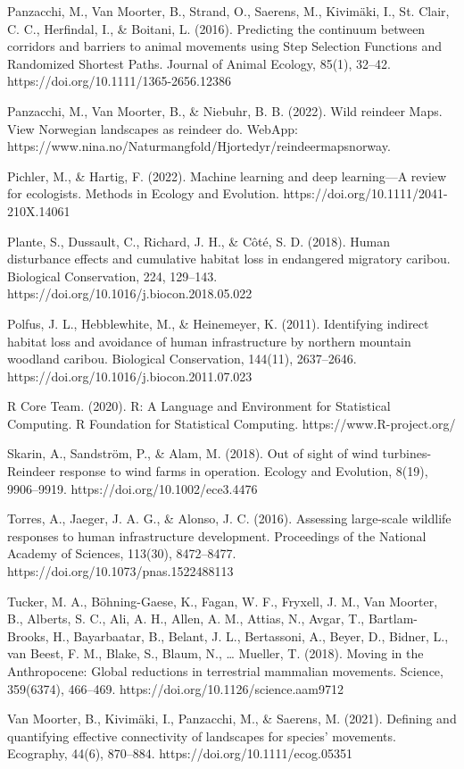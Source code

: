 \documentclass[titlepage]{article}
\begin{document}
Panzacchi, M., Van Moorter, B., Strand, O., Saerens, M., Kivimäki, I., St. Clair, C. C., Herfindal, I., & Boitani, L. (2016). Predicting the continuum between corridors and barriers to animal movements using Step Selection Functions and Randomized Shortest Paths. Journal of Animal Ecology, 85(1), 32–42. https://doi.org/10.1111/1365-2656.12386

Panzacchi, M., Van Moorter, B., & Niebuhr, B. B. (2022). Wild reindeer Maps. View Norwegian landscapes as reindeer do. WebApp: https://www.nina.no/Naturmangfold/Hjortedyr/reindeermapsnorway.

Pichler, M., & Hartig, F. (2022). Machine learning and deep learning—A review for ecologists. Methods in Ecology and Evolution. https://doi.org/10.1111/2041-210X.14061

Plante, S., Dussault, C., Richard, J. H., & Côté, S. D. (2018). Human disturbance effects and cumulative habitat loss in endangered migratory caribou. Biological Conservation, 224, 129–143. https://doi.org/10.1016/j.biocon.2018.05.022

Polfus, J. L., Hebblewhite, M., & Heinemeyer, K. (2011). Identifying indirect habitat loss and avoidance of human infrastructure by northern mountain woodland caribou. Biological Conservation, 144(11), 2637–2646. https://doi.org/10.1016/j.biocon.2011.07.023

R Core Team. (2020). R: A Language and Environment for Statistical Computing. R Foundation for Statistical Computing. https://www.R-project.org/

Skarin, A., Sandström, P., & Alam, M. (2018). Out of sight of wind turbines-Reindeer response to wind farms in operation. Ecology and Evolution, 8(19), 9906–9919. https://doi.org/10.1002/ece3.4476

Torres, A., Jaeger, J. A. G., & Alonso, J. C. (2016). Assessing large-scale wildlife responses to human infrastructure development. Proceedings of the National Academy of Sciences, 113(30), 8472–8477. https://doi.org/10.1073/pnas.1522488113

Tucker, M. A., Böhning-Gaese, K., Fagan, W. F., Fryxell, J. M., Van Moorter, B., Alberts, S. C., Ali, A. H., Allen, A. M., Attias, N., Avgar, T., Bartlam-Brooks, H., Bayarbaatar, B., Belant, J. L., Bertassoni, A., Beyer, D., Bidner, L., van Beest, F. M., Blake, S., Blaum, N., … Mueller, T. (2018). Moving in the Anthropocene: Global reductions in terrestrial mammalian movements. Science, 359(6374), 466–469. https://doi.org/10.1126/science.aam9712

Van Moorter, B., Kivimäki, I., Panzacchi, M., & Saerens, M. (2021). Defining and quantifying effective connectivity of landscapes for species’ movements. Ecography, 44(6), 870–884. https://doi.org/10.1111/ecog.05351
\end{document}
